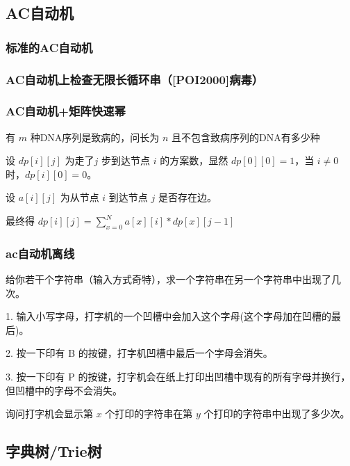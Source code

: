 \documentclass[twoside,a4paper]{article}
\begin{document}
\subsection{AC自动机}

\subsubsection{标准的AC自动机}


\subsubsection{AC自动机上检查无限长循环串（[POI2000]病毒）}


\subsubsection{AC自动机+矩阵快速幂}
有 $m$ 种DNA序列是致病的，问长为 $n$ 且不包含致病序列的DNA有多少种\par
设 $dp[i][j]$ 为走了$j$ 步到达节点 $i$ 的方案数，显然 $dp[0][0]=1$，当 $i \neq 0$ 时，$dp[i][0]=0$。\par
设 $a[i][j]$ 为从节点 $i$ 到达节点 $j$ 是否存在边。\par
最终得 $dp[i][j] = \sum_{x=0}^{N} a[x][i] * dp[x][j-1]$\par


\subsubsection{ac自动机离线}
给你若干个字符串（输入方式奇特），求一个字符串在另一个字符串中出现了几次。\par
1. 输入小写字母，打字机的一个凹槽中会加入这个字母(这个字母加在凹槽的最后)。\par
2. 按一下印有 B 的按键，打字机凹槽中最后一个字母会消失。\par
3. 按一下印有 P 的按键，打字机会在纸上打印出凹槽中现有的所有字母并换行，但凹槽中的字母不会消失。\par
询问打字机会显示第 $x$ 个打印的字符串在第 $y$ 个打印的字符串中出现了多少次。



\subsection{字典树/Trie树}

\end{document}
